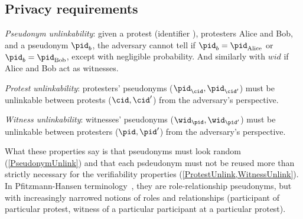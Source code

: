 \subsection{Privacy requirements}%
\label{privacy-properties}


\begin{requirements}[P]
\item\label{PseudonymUnlink} \emph{Pseudonym unlinkability}: given a protest 
  (identifier \cid), protesters Alice and Bob, and a pseudonym \(\pid_b\), the 
  adversary cannot tell if \(\pid_b = \pid_{\text{Alice}}\) or \(\pid_b = 
    \pid_{\text{Bob}}\), except with negligible probability. And similarly with $wid$ if Alice and Bob act as witnesses.
\item\label{ProtestUnlink} \emph{Protest unlinkability}: protesters' pseudonyms 
  (\(\pid_\cid, \pid_{\cid'}\)) must be unlinkable between protests (\(\cid, 
    \cid'\)) from the adversary's perspective.
\item\label{WitnessUnlink}\emph{Witness unlinkability}:  witnesses' pseudonyms 
  (\(\wid_\pid, \wid_{\pid'}\)) must be unlinkable between protesters (\(\pid, 
    \pid'\)) from the adversary's perspective.
\end{requirements}

What these properties say is that pseudonyms must look random 
(\cref{PseudonymUnlink}) and that each psdeudonym must not be reused
more than strictly necessary for the verifiability properties 
(\cref{ProtestUnlink,WitnessUnlink}). In Pfitzmann-Hansen
terminology~\cite{pfitzmannhansen}, they are role-relationship
pseudonyms, but with increasingly narrowed notions of roles and
relationships (participant of particular protest, witness of a
particular participant at a particular protest).
